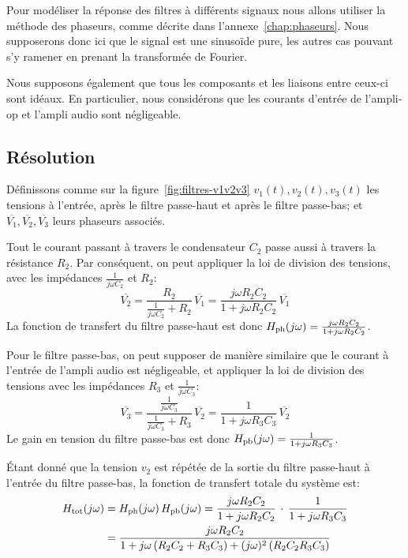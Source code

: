 Pour modéliser la réponse des filtres à différents signaux nous allons utiliser
la méthode des phaseurs, comme décrite dans l'annexe~\ref{chap:phaseurs}.
Nous supposerons donc ici que le signal est une sinusoïde pure, les autres cas
pouvant s'y ramener en prenant la transformée de Fourier.

Nous supposons également que tous les composants et les liaisons entre ceux-ci
sont idéaux.
En particulier, nous considérons que les courants d'entrée de l'ampli-op
et l'ampli audio sont négligeable.

\subsection{Résolution}

Définissons comme sur la figure~\ref{fig:filtres-v1v2v3}
$v_1(t),v_2(t),v_3(t)$ les tensions
à l'entrée, après le filtre passe-haut et après le filtre passe-bas;
et $\overline{V_1}, \overline{V_2}, \overline{V_3}$ leurs phaseurs associés.

Tout le courant passant à travers le condensateur $C_2$ passe
aussi à travers la résistance $R_2$.
Par conséquent, on peut appliquer la loi de division des tensions,
avec les impédances $\frac{1}{j\omega C_2}$ et $R_2$:
\begin{equation}
    \overline{V_2} = \frac{R_2}{\frac{1}{j\omega C_2} + R_2}\,\overline{V_1}
    = \frac{j\omega R_2C_2}{1+j\omega R_2C_2}\,\overline{V_1}
\end{equation}
La fonction de transfert du filtre passe-haut est donc
$H_{\mathrm{ph}}(j\omega) = \frac{j\omega R_2C_2}{1+j\omega R_2C_2}$.

Pour le filtre passe-bas, on peut supposer de manière similaire que
le courant à l'entrée de l'ampli audio est négligeable,
et appliquer la loi de division des tensions avec les impédances
$R_3$ et $\frac{1}{j\omega C_3}$:
\begin{equation}
    \overline{V_3} =
    \frac{\frac{1}{j\omega C_3}}{\frac{1}{j\omega C_3} + R_3}\,\overline{V_2}
    = \frac{1}{1+j\omega R_3C_3}\,\overline{V_2}
\end{equation}
Le gain en tension du filtre passe-bas est donc
$H_{\mathrm{pb}}(j\omega) = \frac{1}{1 + j\omega R_3C_3}$.

Étant donné que la tension $v_2$ est répétée de la sortie du filtre passe-haut
à l'entrée du filtre passe-bas, la fonction de transfert totale du système est:
\begin{align}
    H_{\mathrm{tot}}(j\omega) &= H_{\mathrm{ph}}(j\omega)\,H_{\mathrm{pb}}(j\omega) =
    \frac{j\omega R_2C_2}{1 + j\omega R_2C_2}\,\cdot\,
    \frac{1}{1 + j\omega R_3C_3}\\
    &= \frac{j\omega R_2C_2}{1 + j\omega\,(R_2C_2+R_3C_3) +
        (j\omega)^2\,(R_2C_2R_3C_3)}
\end{align}


